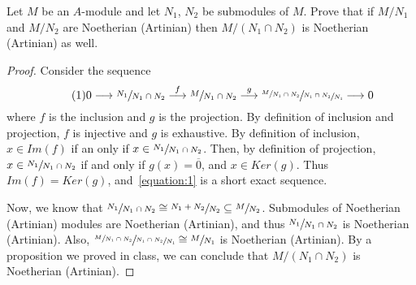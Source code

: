 \begin{problem}
    Let $M$ be an $A$-module and let $N_1$, $N_2$ be submodules of $M$.
    Prove that if $M/N_1$ and $M/N_2$ are Noetherian (Artinian) then $M/(N_1 \cap N_2)$ is Noetherian (Artinian) as well.
    \begin{sol}
        \begin{proof}
            Consider the sequence
            \[ \label{equation:1} \tag{1}
                0 \longrightarrow \sfrac{N_1}{N_1 \cap N_2} \overset{f}{\longrightarrow} \sfrac{M}{N_1 \cap N_2} \overset{g}{\longrightarrow} \sfrac{\sfrac{M}{N_1 \cap N_2}}{\sfrac{N_1 \cap N_2}{N_1}} \longrightarrow 0
            \]
            where $f$ is the inclusion and $g$ is the projection.
            By definition of inclusion and projection, $f$ is injective and $g$ is exhaustive.
            By definition of inclusion, $x \in Im(f)$ if an only if $x \in \sfrac{N_1}{N_1 \cap N_2}$.
            Then, by definition of projection, $x \in \sfrac{N_1}{N_1 \cap N_2}$ if and only if $g(x) = \overline{0}$, and $x \in Ker(g)$.
            Thus $Im(f) = Ker(g)$, and~\ref{equation:1} is a short exact sequence.

            Now, we know that $\sfrac{N_1}{N_1 \cap N_2} \cong \sfrac{N_1 + N_2}{N_2} \subseteq \sfrac{M}{N_2}$.
            Submodules of Noetherian (Artinian) modules are Noetherian (Artinian), and thus $\sfrac{N_1}{N_1 \cap N_2}$ is Noetherian (Artinian).
            Also, $\sfrac{\sfrac{M}{N_1 \cap N_2}}{\sfrac{N_1 \cap N_2}{N_1}} \cong \sfrac{M}{N_1}$ is Noetherian (Artinian).
            By a proposition we proved in class, we can conclude that $M/(N_1 \cap N_2)$ is Noetherian (Artinian).
        \end{proof}
    \end{sol}
\end{problem}